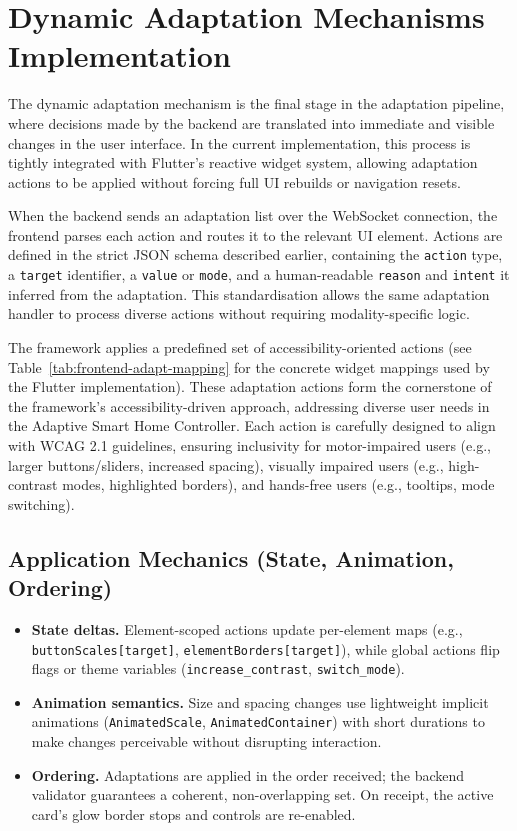 \section{Dynamic Adaptation Mechanisms Implementation}
The dynamic adaptation mechanism is the final stage in the adaptation pipeline, where decisions made by the backend are translated into immediate and visible changes in the user interface. In the current implementation, this process is tightly integrated with Flutter’s reactive widget system, allowing adaptation actions to be applied without forcing full UI rebuilds or navigation resets.

When the backend sends an adaptation list over the WebSocket connection, the frontend parses each action and routes it to the relevant UI element. Actions are defined in the strict JSON schema described earlier, containing the \texttt{action} type, a \texttt{target} identifier, a \texttt{value} or \texttt{mode}, and a human-readable \texttt{reason} and \texttt{intent} it inferred from the adaptation. This standardisation allows the same adaptation handler to process diverse actions without requiring modality-specific logic.

The framework applies a predefined set of accessibility-oriented actions (see Table~\ref{tab:frontend-adapt-mapping} for the concrete widget mappings used by the Flutter implementation).
These adaptation actions form the cornerstone of the framework’s accessibility-driven approach, addressing diverse user needs in the Adaptive Smart Home Controller. Each action is carefully designed to align with WCAG 2.1 guidelines, ensuring inclusivity for motor-impaired users (e.g., larger buttons/sliders, increased spacing), visually impaired users (e.g., high-contrast modes, highlighted borders), and hands-free users (e.g., tooltips, mode switching).

\subsection{Application Mechanics (State, Animation, Ordering)}
\begin{itemize}
  \item \textbf{State deltas.} Element-scoped actions update per-element maps (e.g., \texttt{buttonScales[target]}, \texttt{elementBorders[target]}), while global actions flip flags or theme variables (\texttt{increase\_contrast}, \texttt{switch\_mode}).
  \item \textbf{Animation semantics.} Size and spacing changes use lightweight implicit animations (\texttt{AnimatedScale}, \texttt{AnimatedContainer}) with short durations to make changes perceivable without disrupting interaction.
  \item \textbf{Ordering.} Adaptations are applied in the order received; the backend validator guarantees a coherent, non-overlapping set. On receipt, the active card’s glow border stops and controls are re-enabled.
\end{itemize}

